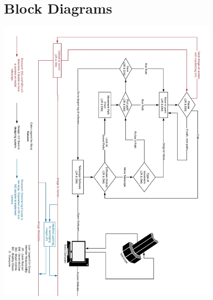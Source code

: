 \documentclass[12pt]{report}
\begin{document}
\begin{figure}
	\section*{Block Diagrams}
	\centering
	\includegraphics[height=\textheight,width=\linewidth]{blockpt2}
\end{figure}
\end{document}
